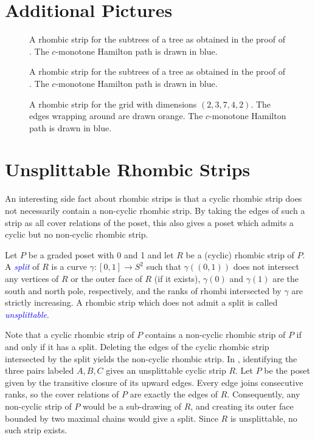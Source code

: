 \documentclass[fontsize=11pt,a4paper,DIV=12]{scrartcl}
\newcommand{\defn}[1]{\textsl{\textcolor{Blue}{#1}}}
\begin{document}
\pagebreak

\appendix

\section{Additional Pictures}

\begin{figure}[ht]
	\centering
	
	\caption{A rhombic strip for the subtrees of a tree as obtained in the proof of . The $c$-monotone Hamilton path is drawn in blue.}
	\label{fig:8 node tree rs}
\end{figure}

\begin{figure}[ht]
	\centering
	
	\caption{A rhombic strip for the subtrees of a tree as obtained in the proof of . The $c$-monotone Hamilton path is drawn in blue.}
	\label{fig:10 node tree rs}
\end{figure}

\begin{figure}
	\centering
	\makebox[\textwidth][c]{}
	\caption{A rhombic strip for the grid with dimensions $(2,3,7,4,2)$. The edges wrapping around are drawn orange. The $c$-monotone Hamilton path is drawn in blue.}
	\label{fig:multiset large}
\end{figure}

\section{Unsplittable Rhombic Strips}\label{sec:unsplittable}

An interesting side fact about rhombic strips is that a cyclic rhombic strip does not necessarily contain a non-cyclic rhombic strip. By taking the edges of such a strip as all cover relations of the poset, this also gives a poset which admits a cyclic but no non-cyclic rhombic strip.

Let $P$ be a graded poset with 0 and 1 and let $R$ be a (cyclic) rhombic strip of $P$. A \defn{split} of $R$ is a curve $\gamma\colon[0,1]\to S^2$ such that $\gamma((0,1))$ does not intersect any vertices of $R$ or the outer face of $R$ (if it exists), $\gamma(0)$ and $\gamma(1)$ are the south and north pole, respectively, and the ranks of rhombi intersected by $\gamma$ are strictly increasing. A rhombic strip which does not admit a split is called \defn{unsplittable}.

Note that a cyclic rhombic strip of $P$ contains a non-cyclic rhombic strip of $P$ if and only if it has a split. Deleting the edges of the cyclic rhombic strip intersected by the split yields the non-cyclic rhombic strip. In , identifying the three pairs labeled $A,B,C$ gives an unsplittable cyclic strip $R$. Let $P$ be the poset given by the transitive closure of its upward edges. Every edge joins consecutive ranks, so the cover relations of $P$ are exactly the edges of $R$. Consequently, any non-cyclic strip of $P$ would be a sub-drawing of $R$, and creating its outer face bounded by two maximal chains would give a split. Since $R$ is unsplittable, no such strip exists.
\end{document}
